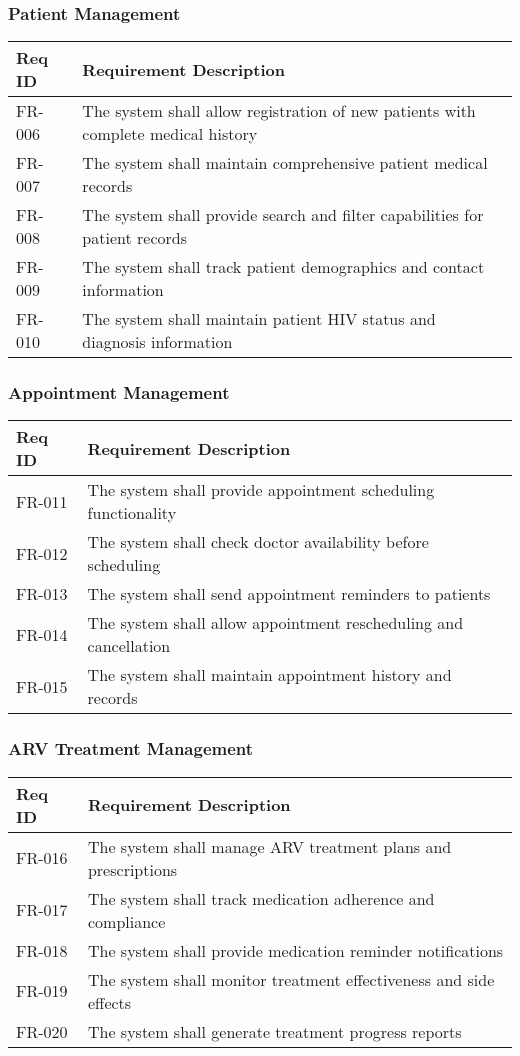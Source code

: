 \documentclass[12pt,a4paper]{article}
\begin{document}
\subsubsection{Patient Management}
\begin{longtable}{|p{2cm}|p{12cm}|}
\hline
\textbf{Req ID} & \textbf{Requirement Description} \\
\hline
FR-006 & The system shall allow registration of new patients with complete medical history \\
\hline
FR-007 & The system shall maintain comprehensive patient medical records \\
\hline
FR-008 & The system shall provide search and filter capabilities for patient records \\
\hline
FR-009 & The system shall track patient demographics and contact information \\
\hline
FR-010 & The system shall maintain patient HIV status and diagnosis information \\
\hline
\end{longtable}

\subsubsection{Appointment Management}
\begin{longtable}{|p{2cm}|p{12cm}|}
\hline
\textbf{Req ID} & \textbf{Requirement Description} \\
\hline
FR-011 & The system shall provide appointment scheduling functionality \\
\hline
FR-012 & The system shall check doctor availability before scheduling \\
\hline
FR-013 & The system shall send appointment reminders to patients \\
\hline
FR-014 & The system shall allow appointment rescheduling and cancellation \\
\hline
FR-015 & The system shall maintain appointment history and records \\
\hline
\end{longtable}

\subsubsection{ARV Treatment Management}
\begin{longtable}{|p{2cm}|p{12cm}|}
\hline
\textbf{Req ID} & \textbf{Requirement Description} \\
\hline
FR-016 & The system shall manage ARV treatment plans and prescriptions \\
\hline
FR-017 & The system shall track medication adherence and compliance \\
\hline
FR-018 & The system shall provide medication reminder notifications \\
\hline
FR-019 & The system shall monitor treatment effectiveness and side effects \\
\hline
FR-020 & The system shall generate treatment progress reports \\
\hline
\end{longtable}
\end{document}
